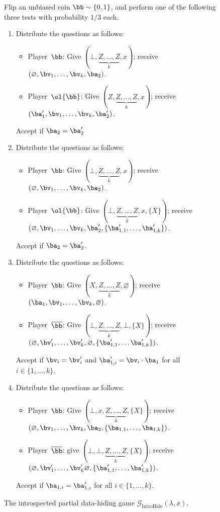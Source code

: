 \documentclass[11pt]{article}
\newcommand{\ktimes}[2]{\underbrace{#1, \dots, #1}_{#2}}
\newcommand{\game}{\mathscr{G}}
\begin{document}
{
\begin{figure}[htbp]
  Flip an unbiased coin $\bb \sim \{0, 1\}$, and perform one of the following three tests with
  probability $1/3$ each.
  \begin{enumerate}
    \item Distribute the questions as follows:\label{item:did-you-give-me-the-right-surface-or-not}
      \begin{itemize}
      \item[$\circ$] Player~$\bb$: Give $(\bot, \ktimes{Z}{k}, x)$; receive
        $(\varnothing, \bv_1, \dots, \bv_k, \ba_2)$.
      \item[$\circ$] Player~$\ol{\bb}$: Give $(Z, \ktimes{Z}{k}, x)$; receive
        $(\ba'_1, \bv_1, \dots, \bv_k, \ba'_2)$.
      \end{itemize}
      Accept if $\ba_2 = \ba'_2$
    \item Distribute the questions as follows:
      \begin{itemize}
        \item[$\circ$] Player~$\bb$: Give $(\bot, \ktimes{Z}{k}, x)$; receive
          $(\varnothing,\bv_1, \dots, \bv_k, \ba_2)$.
        \item[$\circ$] Player~$\ol{\bb}$: Give $(\bot, \ktimes{Z}{k}, x,
          \{X\})$; receive $(\varnothing, \bv_1, \dots, \bv_k, \ba'_2, \{\ba_{1,1}', \dots, \ba_{1,k}'\})$.
        \end{itemize}
        Accept if $\ba_2 = \ba_2'$.
      \item Distribute the questions as follows:
        \begin{itemize}
        \item[$\circ$] Player~$\bb$: Give $(X, \ktimes{Z}{k}, \varnothing)$;
          receive $(\ba_1, \bv_1, \dots, \bv_k, \varnothing)$.
        \item[$\circ$] Player~$\overline{\bb}$: Give $(\bot, \ktimes{Z}{k}, \bot, \{X\})$; receive
        $(\varnothing, \bv'_1, \dots, \bv'_k, \varnothing, \{\ba_{1,1}', \dots \ba_{1,k}'\})$. 
        \end{itemize}
        Accept if $\bv_i = \bv'_i$ and $\ba'_{1,i} = \bv_i \cdot \ba_1$ for all $i \in \{1,
        \dots, k\}$.
      \item 
        Distribute the questions as follows:
        \begin{itemize}
          \item[$\circ$] Player~$\bb$: Give $(\bot, x, \ktimes{Z}{k}, \{X\})$;
            receive $(\varnothing, \bv_1, \dots, \bv_k, \ba_2, \{\ba_{1,1}, \dots,
            \ba_{1,k}\})$.
          \item[$\circ$] Player~$\overline{\bb}$: give $(\bot,
            \bot, \ktimes{Z}{k}, \{X\})$; receive $(\varnothing,
            \bv'_1, \dots, \bv'_k
            \varnothing, \{\ba'_{1,1}, \dots, \ba'_{1,k}\})$.
          \end{itemize}
          Accept if $\ba_{1,i}  = \ba_{1,i}'$ for all $i \in \{1,
          \dots, k\}$.
    \end{enumerate}
\caption{The introspected partial data-hiding game $\game_{\mathrm{IntroHide}}(\lambda, x)$.\label{fig:ihide}}
\end{figure}
}
\end{document}
